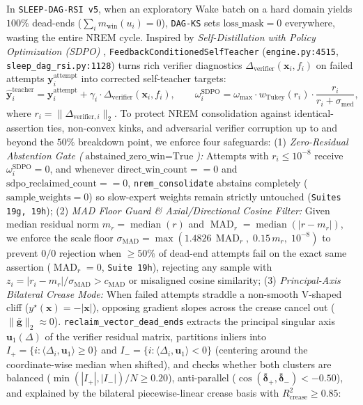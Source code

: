 \documentclass[11pt,a4paper]{article}
\begin{document}
In \texttt{SLEEP-DAG-RSI v5}, when an exploratory Wake batch on a hard domain yields $100\%$ dead-ends ($\sum_i m_{\text{win}}(u_i) = 0$), \texttt{DAG-KS} sets $\text{loss\_mask} = 0$ everywhere, wasting the entire NREM cycle. Inspired by \emph{Self-Distillation with Policy Optimization (SDPO)} \cite{sdpo2026}, \texttt{FeedbackConditionedSelfTeacher} (\texttt{engine.py:4515}, \texttt{sleep\_dag\_rsi.py:1128}) turns rich verifier diagnostics $\Delta_{\text{verifier}}(\mathbf{x}_i, f_i)$ on failed attempts $\mathbf{y}_i^{\text{attempt}}$ into corrected self-teacher targets:
\begin{equation}
\hat{\mathbf{y}}_i^{\text{teacher}} = \mathbf{y}_i^{\text{attempt}} + \gamma_i \cdot \Delta_{\text{verifier}}(\mathbf{x}_i, f_i), \qquad \omega_i^{\text{SDPO}} = \omega_{\max} \cdot w_{\text{Tukey}}(r_i) \cdot \frac{r_i}{r_i + \sigma_{\text{med}}},
\tag{15}\label{eq:sdpo}
\end{equation}
where $r_i = \|\Delta_{\text{verifier}, i}\|_2$. To protect NREM consolidation against identical-assertion ties, non-convex kinks, and adversarial verifier corruption up to and beyond the $50\%$ breakdown point, we enforce four safeguards:
(1) \emph{Zero-Residual Abstention Gate ($\text{abstained\_zero\_win} = \text{True}$):} Attempts with $r_i \le 10^{-8}$ receive $\omega_i^{\text{SDPO}} = 0$, and whenever $\text{direct\_win\_count} == 0$ and $\text{sdpo\_reclaimed\_count} == 0$, \texttt{nrem\_consolidate} abstains completely ($\text{sample\_weights} = 0$) so slow-expert weights remain strictly untouched (\texttt{Suites 19g, 19h});
(2) \emph{MAD Floor Guard \& Axial/Directional Cosine Filter:} Given median residual norm $m_r = \operatorname{median}(r)$ and $\operatorname{MAD}_r = \operatorname{median}(|r - m_r|)$, we enforce the scale floor $\sigma_{\text{MAD}} = \max(1.4826\,\operatorname{MAD}_r,\; 0.15\,m_r,\; 10^{-8})$ to prevent $0/0$ rejection when $\ge 50\%$ of dead-end attempts fail on the exact same assertion ($\operatorname{MAD}_r = 0$, \texttt{Suite 19h}), rejecting any sample with $z_i = |r_i - m_r| / \sigma_{\text{MAD}} > c_{\text{MAD}}$ or misaligned cosine similarity;
(3) \emph{Principal-Axis Bilateral Crease Mode:} When failed attempts straddle a non-smooth V-shaped cliff ($y^\star(\mathbf{x}) = -|\mathbf{x}|$), opposing gradient slopes across the crease cancel out ($\|\bar{\mathbf{g}}\|_2 \approx 0$). \texttt{reclaim\_vector\_dead\_ends} extracts the principal singular axis $\mathbf{u}_1(\Delta)$ of the verifier residual matrix, partitions inliers into $I_+ = \{i : \langle \Delta_i, \mathbf{u}_1 \rangle \ge 0\}$ and $I_- = \{i : \langle \Delta_i, \mathbf{u}_1 \rangle < 0\}$ (centering around the coordinate-wise median when shifted), and checks whether both clusters are balanced ($\min(|I_+|, |I_-|)/N \ge 0.20$), anti-parallel ($\cos(\bar{\boldsymbol{\delta}}_+, \bar{\boldsymbol{\delta}}_-) < -0.50$), and explained by the bilateral piecewise-linear crease basis with $R^2_{\text{crease}} \ge 0.85$:
\end{document}
